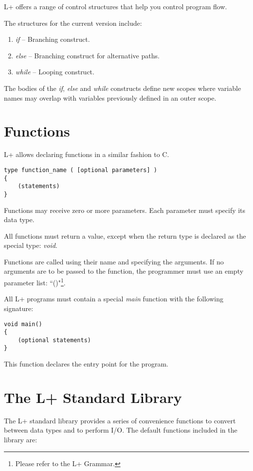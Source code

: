\documentclass[11pt, a4paper]{article}
\begin{document}
L+ offers a range of control structures that help you control program flow.

The structures for the current version include:

\begin{enumerate}
\item \emph{if} -- Branching construct.
\item \emph{else} -- Branching construct for alternative paths.
\item \emph{while} -- Looping construct.
\end{enumerate}

The bodies of the \emph{if}, \emph{else} and \emph{while} constructs define new scopes where variable names may overlap with variables previously defined in an outer scope.

\section{Functions}

L+ allows declaring functions in a similar fashion to C.

\begin{verbatim}
type function_name ( [optional parameters] )
{
    (statements)
}
\end{verbatim}

Functions may receive zero or more parameters. Each parameter must specify its data type.

All functions must return a value, except when the return type is declared as the special type: \emph{void}.

Functions are called using their name and specifying the arguments. If no arguments are to be passed to the function, the programmer must use an empty parameter list: ``()"\footnote{Please refer to the L+ Grammar.}.

All L+ programs must contain a special \emph{main} function with the following signature:

\begin{verbatim}
void main()
{
    (optional statements)
}
\end{verbatim}

This function declares the entry point for the program.

\section{The L+ Standard Library}

The L+ standard library provides a series of convenience functions to convert between data types and to perform I/O. The default functions included in the library are:
\end{document}
